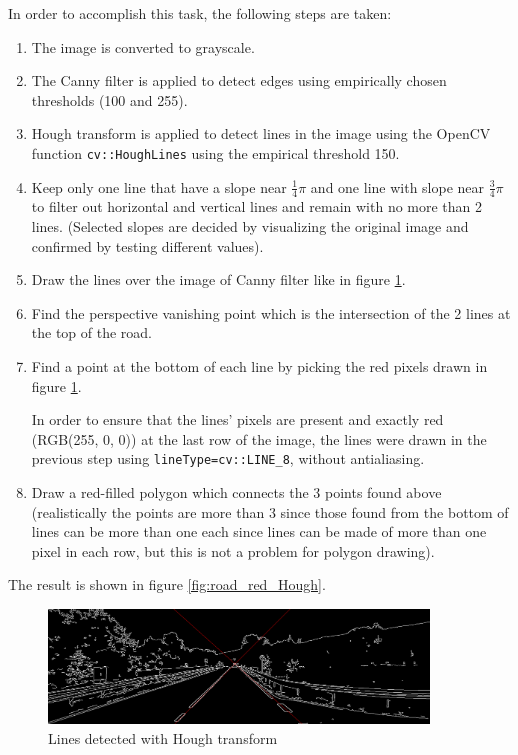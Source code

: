\documentclass{article}
\begin{document}
In order to accomplish this task, the following steps are taken:
\begin{enumerate}
	\item The image is converted to grayscale.
	\item The Canny filter is applied to detect edges using empirically chosen thresholds (100 and 255).
	\item Hough transform is applied to detect lines in the image using the OpenCV function \texttt{cv::HoughLines} using the empirical threshold 150.
	\item Keep only one line that have a slope near $\frac{1}{4} \pi$ and one line with slope near $\frac{3}{4} \pi$ to filter out horizontal and vertical lines and remain with no more than 2 lines. (Selected slopes are decided by visualizing the original image and confirmed by testing different values).
	\item Draw the lines over the image of Canny filter like in figure \ref{fig:2lines_Hough}.
	\item Find the perspective vanishing point which is the intersection of the 2 lines at the top of the road.
	\item Find a point at the bottom of each line by picking the red pixels drawn in figure \ref{fig:2lines_Hough}.

	In order to ensure that the lines' pixels are present and exactly red (RGB(255, 0, 0)) at the last row of the image, the lines were drawn in the previous step using \texttt{lineType=cv::LINE\_8}, without antialiasing.
	\item Draw a red-filled polygon which connects the 3 points found above (realistically the points are more than 3 since those found from the bottom of lines can be more than one each since lines can be made of more than one pixel in each row, but this is not a problem for polygon drawing).
\end{enumerate}

The result is shown in figure \ref{fig:road_red_Hough}.

\begin{figure}[h]
	\centering
	\includegraphics[width=0.9\textwidth]{street_scene_Hough2Lines.png}
	\caption{Lines detected with Hough transform}
	\label{fig:2lines_Hough}
\end{figure}
\end{document}
